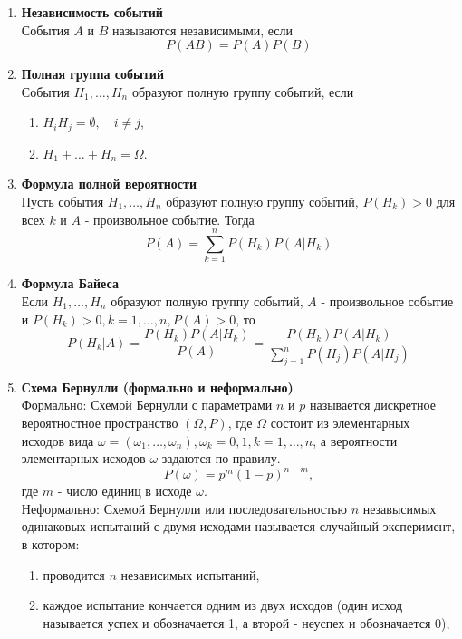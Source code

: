 \documentclass[A4]{article}
\begin{document}
\begin{enumerate}
	\item \textbf{Независимость событий}\\
	События $A$ и $B$ называются независимыми, если 
	\begin{equation}
	P(AB)=P(A)P(B)
	\end{equation}
	\item \textbf{Полная группа событий}\\
	События $H_1,\ldots,H_n$ образуют полную группу событий, если 
	\begin{enumerate}
		\item $H_iH_j=\emptyset,\quad i\ne j$,
		\item $H_1+\ldots+H_n=\Omega$.
	\end{enumerate}
	\item \textbf{Формула полной вероятности}\\
	Пусть события $H_1,\ldots,H_n$ образуют полную группу событий, $P(H_k)>0$ для всех $k$ и $A$ - произвольное событие. Тогда
	\begin{equation}
	P(A)=\sum_{k=1}^{n} P(H_k)P(A|H_k)
	\end{equation} 
	\item \textbf{Формула Байеса}\\
	Если $H_1,\ldots,H_n$ образуют полную группу событий, $A$ - произвольное событие и $P(H_k)>0,k=1,\ldots,n,P(A)>0$, то
	\begin{equation}
	P(H_k|A)=\frac{P(H_k)P(A|H_k)}{P(A)}=\frac{P(H_k)P(A|H_k)}{\sum_{j=1}^{n} P(H_j)P(A|H_j)}
	\end{equation}
	\item \textbf{Схема Бернулли (формально и неформально)}\\
	Формально: Схемой Бернулли с параметрами $n$ и $p$ называется дискретное вероятностное пространство $(\Omega,P)$, где $\Omega$ состоит из элементарных исходов вида $\omega=(\omega_1,\ldots,\omega_n),\omega_k=0,1, k=1,\ldots,n$, а вероятности элементарных исходов $\omega$ задаются по правилу.
	\begin{equation}
	P(\omega)=p^m(1-p)^{n-m},
	\end{equation} 
	где $m$ - число единиц в исходе $\omega$.\\
	Неформально: Схемой Бернулли или последовательностью $n$ незавысимых одинаковых испытаний с двумя исходами называется случайный эксперимент, в котором:
	\begin{enumerate}
		\item проводится $n$ независимых испытаний,
		\item каждое испытание кончается одним из двух исходов (один исход называется успех и обозначается 1, а второй - неуспех и обозначается 0),

\end{enumerate}
\end{enumerate}
\end{document}

